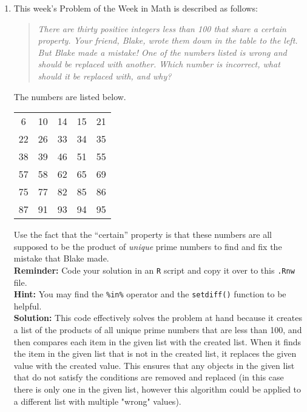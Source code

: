 \documentclass{article}\usepackage[]{graphicx}\usepackage[]{xcolor}
\begin{document}
\begin{enumerate}
\item This week's Problem of the Week in Math is described as follows:
\begin{quotation}
  \textit{There are thirty positive integers less than 100 that share a certain 
  property. Your friend, Blake, wrote them down in the table to the left. But 
  Blake made a mistake! One of the numbers listed is wrong and should be replaced 
  with another. Which number is incorrect, what should it be replaced with, and 
  why?}
\end{quotation}
The numbers are listed below.
\begin{center}
  \begin{tabular}{ccccc}
    6 & 10 & 14 & 15 & 21\\
    22 & 26 & 33 & 34 & 35\\
    38 & 39 & 46 & 51 & 55\\
    57 & 58 & 62 & 65 & 69\\
    75 & 77 & 82 & 85 & 86\\
    87 & 91 & 93 & 94 & 95
  \end{tabular}
\end{center}
Use the fact that the ``certain'' property is that these numbers are all supposed
to be the product of \emph{unique} prime numbers to find and fix the mistake that
Blake made.\\
\textbf{Reminder:} Code your solution in an \texttt{R} script and copy it over
to this \texttt{.Rnw} file.\\
\textbf{Hint:} You may find the \verb|%in%| operator and the \verb|setdiff()| function to be helpful.\\

\textbf{Solution:}
This code effectively solves the problem at hand because it creates a list of the products of all unique prime numbers that are less than 100, and then compares each item in the given list with the created list. When it finds the item in the given list that is not in the created list, it replaces the given value with the created value. This ensures that any objects in the given list that do not satisfy the conditions are removed and replaced (in this case there is only one in the given list, however this algorithm could be applied to a different list with multiple "wrong" values).


\end{enumerate}
\end{document}
